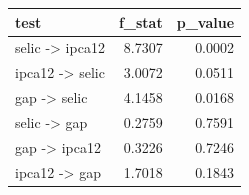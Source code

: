 
\begin{tabular}{lrr}
\toprule
test & f\_stat & p\_value\\
\midrule
selic -> ipca12 & 8.7307 & 0.0002\\
ipca12 -> selic & 3.0072 & 0.0511\\
gap -> selic & 4.1458 & 0.0168\\
selic -> gap & 0.2759 & 0.7591\\
gap -> ipca12 & 0.3226 & 0.7246\\
\addlinespace
ipca12 -> gap & 1.7018 & 0.1843\\
\bottomrule
\end{tabular}
